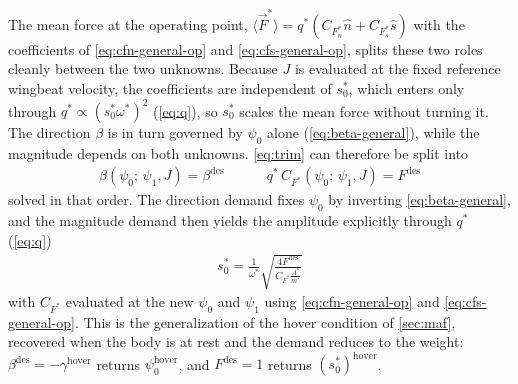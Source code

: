 \documentclass[11pt,letterpaper]{article}
\begin{document}
The mean force at the operating point,
$\langle \vec{F}^* \rangle = q^* \left( C_{F^*_n} \hat{n}
+ C_{F^*_s} \hat{s} \right)$ with the coefficients of
\autoref{eq:cfn-general-op} and \autoref{eq:cfs-general-op},
splits these two roles cleanly between the two unknowns. Because
$J$ is evaluated at the fixed reference wingbeat velocity, the
coefficients are independent of $s_0^*$, which enters only through
$q^* \propto (s_0^* \omega^*)^2$
(\autoref{eq:q}), so $s_0^*$ scales the mean force without turning it.
The direction $\beta$ is in turn governed by $\psi_0$ alone
(\autoref{eq:beta-general}), while the magnitude depends on both
unknowns. \autoref{eq:trim} can therefore be split into
\begin{align}
    \beta \left( \psi_0;\, \psi_1, J \right) = \beta^\text{des}
    \quad\quad\quad
    q^*\, C_{F^*} \left( \psi_0;\, \psi_1, J \right) = F^\text{des}
    \label{eq:trim-split}
\end{align}
solved in that order. The direction demand fixes $\psi_0$ by
inverting \autoref{eq:beta-general}, and the magnitude demand then
yields the amplitude explicitly through $q^*$ (\autoref{eq:q})
\begin{align}
    s_0^* = \frac{1}{\omega^*}
    \sqrt{\frac{4 F^\text{des}}{C_{F^*} \frac{A^*}{m^*}}}
\end{align}
with $C_{F^*}$ evaluated at the new $\psi_0$ and $\psi_1$ using
\autoref{eq:cfn-general-op} and \autoref{eq:cfs-general-op}.
This is the generalization of the hover condition of
\autoref{sec:maf}, recovered when the body is at rest and the
demand reduces to the weight: $\beta^\text{des} =
-\gamma^\text{hover}$ returns $\psi_0^\text{hover}$, and
$F^\text{des} = 1$ returns $(s_0^*)^\text{hover}$.
\end{document}
